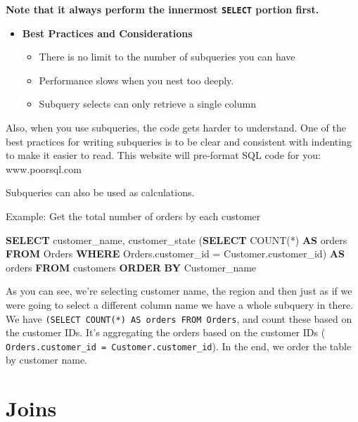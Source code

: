 \documentclass[]{book}
\newenvironment{Shaded}{\begin{snugshade}}{\end{snugshade}}
\newcommand{\KeywordTok}[1]{\textcolor[rgb]{0.13,0.29,0.53}{\textbf{{#1}}}}
\newcommand{\FunctionTok}[1]{\textcolor[rgb]{0.00,0.00,0.00}{{#1}}}
\newcommand{\NormalTok}[1]{{#1}}
\providecommand{\tightlist}{%
  \setlength{\itemsep}{0pt}\setlength{\parskip}{0pt}}
\theoremstyle{definition}
\theoremstyle{definition}
\theoremstyle{remark}
\begin{document}
\textbf{Note that it always perform the innermost \texttt{SELECT}
portion first. }

\begin{itemize}
\tightlist
\item
  \textbf{Best Practices and Considerations}

  \begin{itemize}
  \tightlist
  \item
    There is no limit to the number of subqueries you can have
  \item
    Performance slows when you nest too deeply.
  \item
    Subquery selects can only retrieve a single column
  \end{itemize}
\end{itemize}

Also, when you use subqueries, the code gets harder to understand. One
of the best practices for writing subqueries is to be clear and
consistent with indenting to make it easier to read. This website will
pre-format SQL code for you: www.poorsql.com

Subqueries can also be used as calculations.

Example: Get the total number of orders by each customer

\begin{Shaded}
\begin{Highlighting}[]
\KeywordTok{SELECT} \NormalTok{customer_name,}
    \NormalTok{customer_state (}\KeywordTok{SELECT} \FunctionTok{COUNT}\NormalTok{(*) }\KeywordTok{AS} \NormalTok{orders }\KeywordTok{FROM} \NormalTok{Orders }\KeywordTok{WHERE} 
        \NormalTok{Orders.customer_id = Customer.customer_id) }\KeywordTok{AS} \NormalTok{orders}
\KeywordTok{FROM} \NormalTok{customers}
\KeywordTok{ORDER} \KeywordTok{BY} \NormalTok{Customer_name}
\end{Highlighting}
\end{Shaded}

As you can see, we're selecting customer name, the region and then just
as if we were going to select a different column name we have a whole
subquery in there. We have
\texttt{(SELECT\ COUNT(*)\ AS\ orders\ FROM\ Orders}, and count these
based on the customer IDs. It's aggregating the orders based on the
customer IDs ( \texttt{Orders.customer\_id\ =\ Customer.customer\_id}).
In the end, we order the table by customer name.

\section{Joins}\label{joins}
\end{document}
